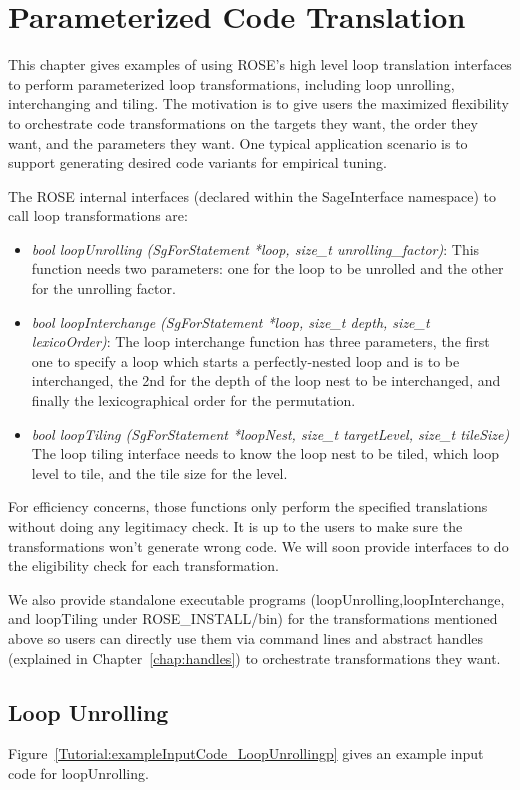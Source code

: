 \chapter{Parameterized Code Translation}
This chapter gives examples of using ROSE's high level loop translation
interfaces to perform parameterized loop transformations, including loop
unrolling, interchanging and tiling. 
The motivation is to give users the maximized flexibility to orchestrate
code transformations on the targets they want, the order they
want, and the parameters they want.
One typical application scenario is to support generating desired code
variants for empirical tuning. 

The ROSE internal interfaces (declared within the SageInterface namespace) to call loop transformations are:
\begin{itemize}
\item \textit{bool loopUnrolling (SgForStatement *loop, size\_t
unrolling\_factor)}: 
This function needs two parameters: one for the loop to be
unrolled and the other for the unrolling factor. 
\item \textit{bool  loopInterchange (SgForStatement *loop, size\_t depth,
size\_t lexicoOrder)}:
The loop interchange function has three parameters, the first one to
specify a loop which starts a perfectly-nested loop and is to be
interchanged, the 2nd for the depth of the loop nest to be interchanged, and finally the
lexicographical order for the permutation. 
\item \textit{bool  loopTiling (SgForStatement *loopNest, size\_t
targetLevel, size\_t tileSize)}
The loop tiling interface needs to know the loop nest to be tiled, which
loop level to tile, and the tile size for the level. 
\end{itemize} 
For efficiency concerns, those functions only perform the specified
translations without doing any legitimacy check. 
It is up to the users to
make sure the transformations won't generate wrong code.
We will soon provide interfaces to do the eligibility check for each
transformation. 

We also provide standalone executable programs
(loopUnrolling,loopInterchange, and loopTiling under ROSE\_INSTALL/bin) for the
transformations mentioned above so users can directly use them via command
lines and abstract handles (explained in Chapter~\ref{chap:handles}) to orchestrate transformations they want.
\section{Loop Unrolling}
Figure~\ref{Tutorial:exampleInputCode_LoopUnrollingp} gives an example
input code for loopUnrolling.

